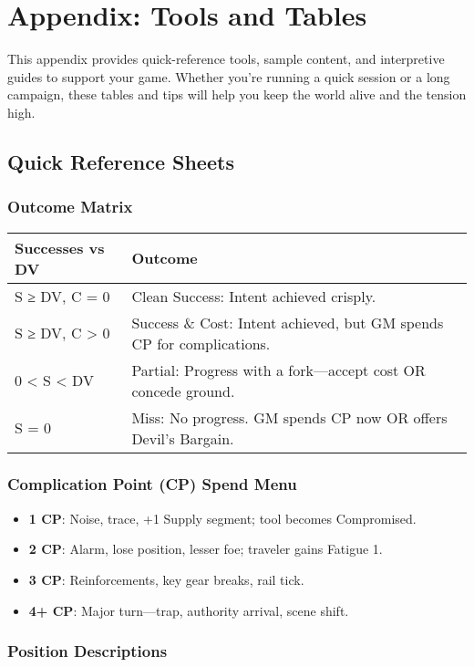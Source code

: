 \chapter{Appendix: Tools and Tables}

This appendix provides quick-reference tools, sample content, and interpretive guides to support your game. Whether you're running a quick session or a long campaign, these tables and tips will help you keep the world alive and the tension high.

\section*{Quick Reference Sheets}

\subsection*{Outcome Matrix}

\begin{tabular}{|l|l|}
\hline
\textbf{Successes vs DV} & \textbf{Outcome} \\
\hline
S ≥ DV, C = 0 & Clean Success: Intent achieved crisply. \\
S ≥ DV, C > 0 & Success \& Cost: Intent achieved, but GM spends CP for complications. \\
0 < S < DV & Partial: Progress with a fork—accept cost OR concede ground. \\
S = 0 & Miss: No progress. GM spends CP now OR offers Devil’s Bargain. \\
\hline
\end{tabular}

\subsection*{Complication Point (CP) Spend Menu}

\begin{itemize}
    \item \textbf{1 CP}: Noise, trace, +1 Supply segment; tool becomes Compromised.
    \item \textbf{2 CP}: Alarm, lose position, lesser foe; traveler gains Fatigue 1.
    \item \textbf{3 CP}: Reinforcements, key gear breaks, rail tick.
    \item \textbf{4+ CP}: Major turn—trap, authority arrival, scene shift.
\end{itemize}

\subsection*{Position Descriptions}

